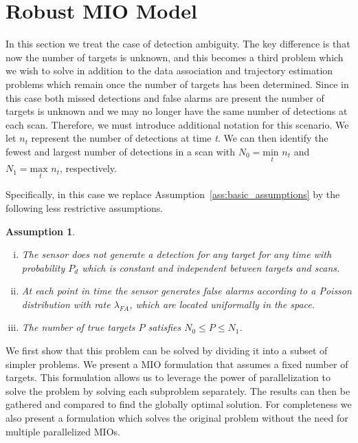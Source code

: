 \documentclass[journal]{IEEEtran}
\newtheorem{assumption}{Assumption}
\begin{document}
\section{Robust MIO Model}\label{sec:Robust MIO Model}
In this section we treat the case of detection ambiguity. The key difference is that now the number of targets is unknown, and this becomes a third problem which we wish to solve in addition to the data association and trajectory estimation problems which remain once the number of targets has been determined. Since in this case both missed detections and false alarms are present the number of targets is unknown and we may no longer have the same number of detections at each scan. Therefore, we must introduce additional notation for this scenario. We let $n_{t}$ represent  the number of detections at time \textit{t}. We can then identify the fewest and largest number of detections in a scan with $N_{0} = \underset{t}{\text{min }} n_{t}$ and $N_{1} = \underset{t}{\text{max }}  n_{t}$, respectively. 

Specifically, in this case we replace Assumption~\ref{ass:basic_assumptions} by the following less restrictive assumptions.
\begin{assumption}\label{ass:robust_assumptions}
\begin{enumerate}[(i)]
\item The sensor does not generate a detection for any target for any time with probability $P_{d}$ which is constant and independent between targets and scans.
\item At each point in time the sensor generates false alarms according to a Poisson distribution with rate $\lambda_{FA}$, which are located uniformally in the space.
\item The number of true targets $P$ satisfies $N_0\leq P \leq N_1$.
\end{enumerate}
\end{assumption}

We first show that this problem can be solved by dividing it into a subset of simpler problems. We present a MIO formulation that assumes a fixed number of targets. This formulation allows us to leverage the power of parallelization to solve the problem by solving each subproblem separately. The results can then be gathered and compared to find the globally optimal solution. For completeness we also present a formulation which solves the original problem without the need for multiple parallelized MIOs.
\end{document}
